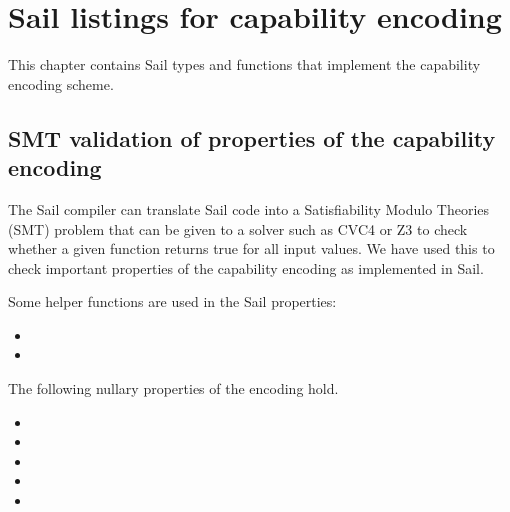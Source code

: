 
\chapter{Sail listings for capability encoding}
\label{chap:sailenc}

This chapter contains Sail types and functions that implement the
capability encoding scheme.

\medskip
{}

\medskip
{}

\medskip
\label{sailRISCVzencCapabilityToCapability}
\sailRISCVfnencCapabilityToCapability

\medskip
\sailRISCVfncapToEncCap

\medskip
\sailRISCVfngetCapBoundsBits

\medskip
\sailRISCVfnsetCapBounds

\medskip
\sailRISCVfnsetCapBoundsRoundDown

\medskip
\sailRISCVfngetRepresentableAlignmentMask

\medskip
\sailRISCVfngetRepresentableLength

\section{SMT validation of properties of the capability encoding}

The Sail compiler can translate Sail code into a Satisfiability Modulo Theories
(SMT) problem that can be given to a solver such as CVC4 or Z3 to check whether
a given function returns true for all input values. We have used this to
check important properties of the capability encoding as implemented in Sail.

Some helper functions are used in the Sail properties:

\begin{itemize}
  \item {}
  \item {}
\end{itemize}

The following nullary properties of the encoding hold.

\begin{itemize}
  \item {}
  \item {}
  \item {}
  \item {}
  \item {}
\end{itemize}

